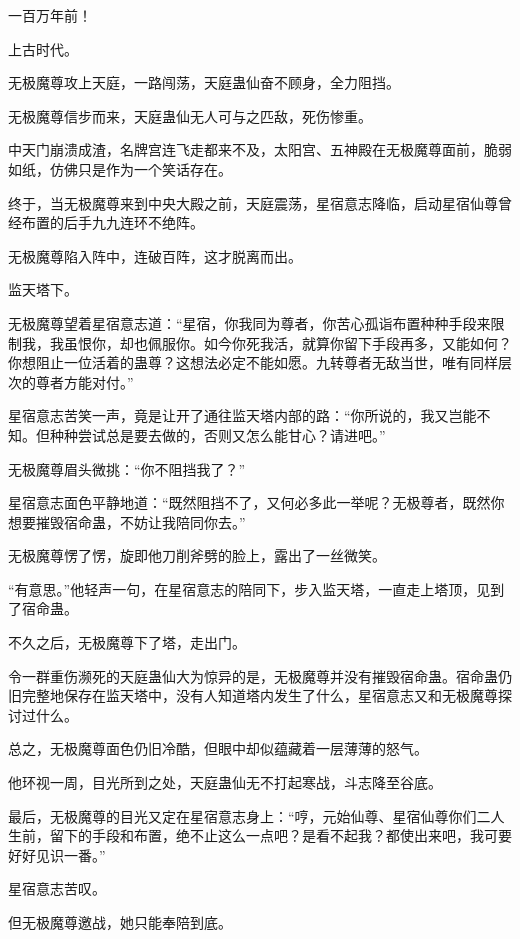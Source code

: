 
\begin{this_body}

一百万年前！

上古时代。

无极魔尊攻上天庭，一路闯荡，天庭蛊仙奋不顾身，全力阻挡。

无极魔尊信步而来，天庭蛊仙无人可与之匹敌，死伤惨重。

中天门崩溃成渣，名牌宫连飞走都来不及，太阳宫、五神殿在无极魔尊面前，脆弱如纸，仿佛只是作为一个笑话存在。

终于，当无极魔尊来到中央大殿之前，天庭震荡，星宿意志降临，启动星宿仙尊曾经布置的后手九九连环不绝阵。

无极魔尊陷入阵中，连破百阵，这才脱离而出。

监天塔下。

无极魔尊望着星宿意志道：“星宿，你我同为尊者，你苦心孤诣布置种种手段来限制我，我虽恨你，却也佩服你。如今你死我活，就算你留下手段再多，又能如何？你想阻止一位活着的蛊尊？这想法必定不能如愿。九转尊者无敌当世，唯有同样层次的尊者方能对付。”

星宿意志苦笑一声，竟是让开了通往监天塔内部的路：“你所说的，我又岂能不知。但种种尝试总是要去做的，否则又怎么能甘心？请进吧。”

无极魔尊眉头微挑：“你不阻挡我了？”

星宿意志面色平静地道：“既然阻挡不了，又何必多此一举呢？无极尊者，既然你想要摧毁宿命蛊，不妨让我陪同你去。”

无极魔尊愣了愣，旋即他刀削斧劈的脸上，露出了一丝微笑。

“有意思。”他轻声一句，在星宿意志的陪同下，步入监天塔，一直走上塔顶，见到了宿命蛊。

不久之后，无极魔尊下了塔，走出门。

令一群重伤濒死的天庭蛊仙大为惊异的是，无极魔尊并没有摧毁宿命蛊。宿命蛊仍旧完整地保存在监天塔中，没有人知道塔内发生了什么，星宿意志又和无极魔尊探讨过什么。

总之，无极魔尊面色仍旧冷酷，但眼中却似蕴藏着一层薄薄的怒气。

他环视一周，目光所到之处，天庭蛊仙无不打起寒战，斗志降至谷底。

最后，无极魔尊的目光又定在星宿意志身上：“哼，元始仙尊、星宿仙尊你们二人生前，留下的手段和布置，绝不止这么一点吧？是看不起我？都使出来吧，我可要好好见识一番。”

星宿意志苦叹。

但无极魔尊邀战，她只能奉陪到底。


\end{this_body}
